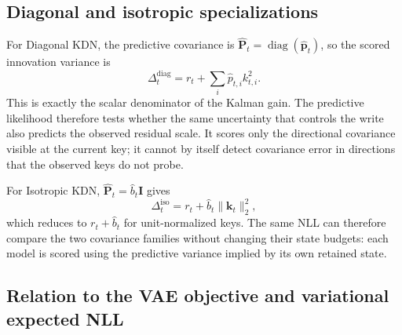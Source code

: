 \documentclass[11pt]{article}
\newcommand{\vct}[1]{\boldsymbol{#1}}
\newcommand{\diag}{\operatorname{diag}}
\begin{document}
\subsection{Diagonal and isotropic specializations}

For Diagonal KDN, the predictive covariance is
$\widehat{\vct{P}}_t=\diag(\widehat{\vct{p}}_t)$, so the scored innovation variance is
\begin{equation}
  \Delta_t^{\mathrm{diag}}
  =r_t+\sum_i\widehat p_{t,i}k_{t,i}^2.
  \label{eq:discussion-diag-predictive-innovation-variance}
\end{equation}
This is exactly the scalar denominator of the Kalman gain. The predictive likelihood therefore
tests whether the same uncertainty that controls the write also predicts the observed residual
scale. It scores only the directional covariance visible at the current key; it cannot by itself
detect covariance error in directions that the observed keys do not probe.

For Isotropic KDN, $\widehat{\vct{P}}_t=\widehat b_t\vct{I}$ gives
\begin{equation}
  \Delta_t^{\mathrm{iso}}
  =r_t+\widehat b_t\|\vct{k}_t\|_2^2,
  \label{eq:discussion-iso-predictive-innovation-variance}
\end{equation}
which reduces to $r_t+\widehat b_t$ for unit-normalized keys. The same NLL can therefore compare
the two covariance families without changing their state budgets: each model is scored using the
predictive variance implied by its own retained state.

\subsection{Relation to the VAE objective and variational expected NLL}
\end{document}
